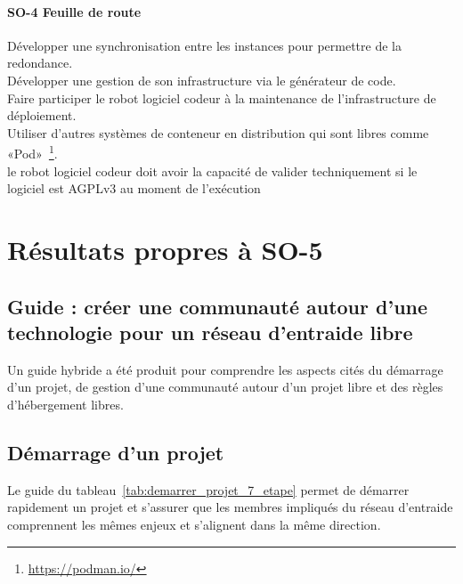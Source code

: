 \paragraph{SO-4 Feuille de route}
Développer une synchronisation entre les instances pour permettre de la redondance.\\
Développer une gestion de son infrastructure via le générateur de code.\\
Faire participer le robot logiciel codeur à la maintenance de l’infrastructure de déploiement.\\
Utiliser d’autres systèmes de conteneur en distribution qui sont libres comme «Pod»~\footnote{\url{https://podman.io/}}.\\
le robot logiciel codeur doit avoir la capacité de valider techniquement si le logiciel est AGPLv3 au moment de l’exécution

\section{Résultats propres à SO-5}

\subsection{Guide : créer une communauté autour d’une technologie pour un réseau d’entraide libre}

Un guide hybride a été produit pour comprendre les aspects cités du démarrage d’un projet, de gestion d’une communauté autour d’un projet libre et des règles d'hébergement libres.

\subsection{Démarrage d’un projet}

Le guide du tableau~\ref{tab:demarrer_projet_7_etape} permet de démarrer rapidement un projet et s'assurer que les membres impliqués du réseau d'entraide comprennent les mêmes enjeux et s'alignent dans la même direction.


